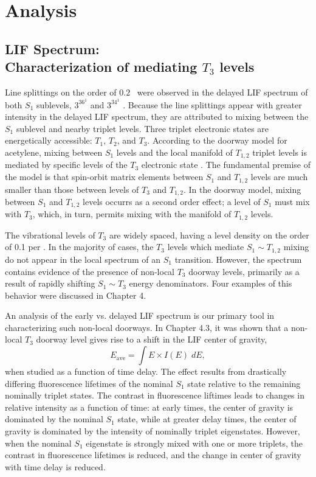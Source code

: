 \documentclass[12pt]{mitthesis}
\begin{document}
\section{Analysis}

\subsection{LIF Spectrum: \\Characterization of mediating $T_3$
  levels}

Line splittings on the order of $0.2$ \rcm\ were observed in the
delayed LIF spectrum of both $S_1$ sublevels, $3^36^1$  and
$3^34^1$ .  Because the line splittings appear with greater
intensity in the delayed LIF spectrum, they are attributed to mixing
between the $S_1$ sublevel and nearby triplet levels.  Three triplet
electronic states are energetically accessible: $T_1$, $T_2$, and
$T_3$.  According to the doorway model for acetylene, mixing between
$S_1$ levels and the local manifold of $T_{1,2}$ triplet levels is
mediated by specific levels of the $T_3$ electronic state .
The fundamental premise of the model is that spin-orbit matrix
elements between $S_1$ and $T_{1,2}$ levels are much smaller than
those between levels of $T_3$ and $T_{1,2}$.  In the doorway model,
mixing between $S_1$ and $T_{1,2}$ levels occurrs as a second order
effect; a level of $S_1$ must mix with $T_3$, which, in turn, permits
mixing with the manifold of $T_{1,2}$ levels.

The vibrational levels of $T_3$ are widely spaced, having a level
density on the order of 0.1 per \rcm \cite{thom07}.  In the majority
of cases, the $T_3$ levels which mediate $S_1 \sim T_{1,2}$ mixing do
not appear in the local spectrum of an $S_1$ transition.  However, the
spectrum contains evidence of the presence of non-local $T_3$ doorway
levels, primarily as a result of rapidly shifting $S_1 \sim T_3$
energy denominators.  Four examples of this behavior were discussed in
Chapter 4.

An analysis of the early vs. delayed LIF spectrum is our primary tool
in characterizing such non-local doorways.  In Chapter 4.3, it was
shown that a non-local $T_3$ doorway level gives rise to a shift in
the LIF center of gravity,
\begin{equation}
  E_{\text{ave}} = \int E \times I(E) \; dE,
\end{equation}
when studied as a function of time delay.  The effect results from
drastically differing fluorescence lifetimes of the nominal $S_1$
state relative to the remaining nominally triplet states.  The
contrast in fluorescence liftimes leads to changes in relative
intensity as a function of time: at early times, the center of gravity
is dominated by the nominal $S_1$ state, while at greater delay times,
the center of gravity is dominated by the intensity of nominally
triplet eigenstates.  However, when the nominal $S_1$ eigenstate is
strongly mixed with one or more triplets, the contrast in fluorescence
lifetimes is reduced, and the change in center of gravity with time
delay is reduced.
\end{document}
